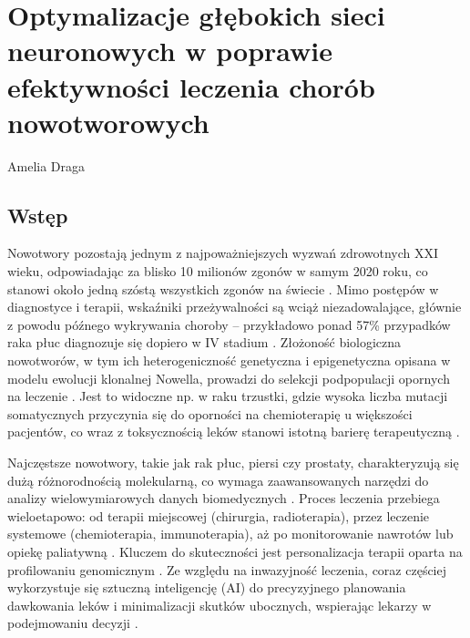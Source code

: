 \chapter[Optymalizacje głębokich \ldots]{Optymalizacje głębokich sieci neuronowych w poprawie efektywności leczenia chorób nowotworowych}

\thispagestyle{empty}
\vspace{-8mm} {\large Amelia Draga} \vspace{8mm}

\section{Wstęp}\label{intro09}
Nowotwory pozostają jednym  z najpoważniejszych wyzwań zdrowotnych XXI wieku, odpowiadając za blisko 10 milionów zgonów w samym 2020 roku, co stanowi około jedną szóstą wszystkich zgonów na świecie \cite{WHO, who2024}. Mimo postępów w diagnostyce i terapii, wskaźniki przeżywalności są wciąż niezadowalające, głównie z powodu późnego wykrywania choroby – przykładowo ponad 57\% przypadków raka płuc diagnozuje się dopiero w IV stadium \cite{EE1, NN1, who2024}. Złożoność biologiczna nowotworów, w tym ich heterogeniczność genetyczna i epigenetyczna opisana w modelu ewolucji klonalnej Nowella, prowadzi do selekcji podpopulacji opornych na leczenie \cite{CC1, DD1, BB1, GG2}. Jest to widoczne np. w raku trzustki, gdzie wysoka liczba mutacji somatycznych przyczynia się do oporności na chemioterapię u większości pacjentów, co wraz z toksycznością leków stanowi istotną barierę terapeutyczną \cite{CC2, BB2}.

Najczęstsze nowotwory, takie jak rak płuc, piersi czy prostaty, charakteryzują się dużą różnorodnością molekularną, co wymaga zaawansowanych narzędzi do analizy wielowymiarowych danych biomedycznych \cite{LL1, OO1}. Proces leczenia przebiega wieloetapowo: od terapii miejscowej (chirurgia, radioterapia), przez leczenie systemowe (chemioterapia, immunoterapia), aż po monitorowanie nawrotów lub opiekę paliatywną \cite{HH1, BB2, FF2, ZZ1}. Kluczem do skuteczności jest personalizacja terapii oparta na profilowaniu genomicznym \cite{AA1, EE2}. Ze względu na inwazyjność leczenia, coraz częściej wykorzystuje się sztuczną inteligencję (AI) do precyzyjnego planowania dawkowania leków i minimalizacji skutków ubocznych, wspierając lekarzy w podejmowaniu decyzji \cite{GG1, UU1}.

